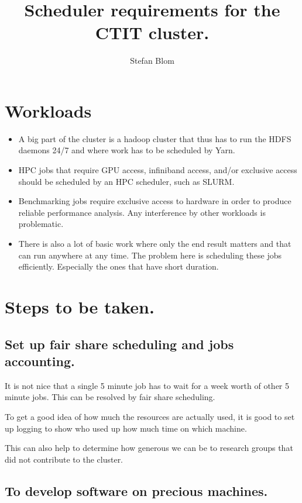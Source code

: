 \documentclass{article}
\title{Scheduler requirements for the CTIT cluster.}
\author{Stefan Blom}
\begin{document}
\maketitle

\section{Workloads}

\begin{itemize}
\item A big part of the cluster is a hadoop cluster that thus has to run the
HDFS daemons 24/7 and where work has to be scheduled by Yarn.
\item HPC jobs that require GPU access, infiniband access, and/or exclusive access
should be scheduled by an HPC scheduler, such as SLURM.
\item Benchmarking jobs require exclusive access to hardware in order
to produce reliable performance analysis. Any interference by other workloads is problematic.
\item There is also a lot of basic work where only the end result matters and that can run 
anywhere at any time. The problem here is scheduling these jobs efficiently.
Especially the ones that have short duration.
\end{itemize}



\section{Steps to be taken.}

\subsection{Set up fair share scheduling and jobs accounting.}

It is not nice that a single 5 minute job has to wait for a week worth
of other 5 minute jobs. This can be resolved by fair share scheduling.

To get a good idea of how much the resources are actually used,
it is good to set up logging to show who used up how much time on which machine.

This can also help to determine how generous we can be to
research groups that did not contribute to the cluster.

\subsection{To develop software on precious machines.}
\end{document}
